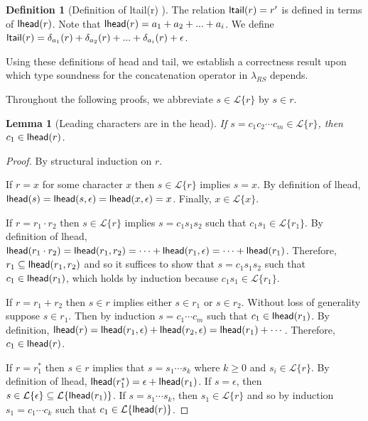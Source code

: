 \documentclass[11pt,leqno]{article}
\newtheorem{trlem}[tr]{Lemma}
\theoremstyle{definition}
\newtheorem{defn}[thm]{Definition}
\newcommand{\Lagr}{\mathcal{L}}
\newcommand{\lang}[1]{\Lagr\{#1\}}
\newcommand{\lambdas}{\lambda_{RS}}
\newcommand{\lhead}[1]{ {\sf lhead}(#1) }
\newcommand{\ltail}[1]{ {\sf ltail}(#1) }
\begin{document}
\begin{defn}[Definition of \ltail{r}]
The relation $\ltail{r} = r'$ is defined in terms of $\lhead{r}$.
Note that $\lhead{r} = a_1 + a_2 + ... + a_i$.
We define $\ltail{r} = \delta_{a_1}(r) + \delta_{a_2}(r) + ... + \delta_{a_i}(r) + \epsilon$.
\end{defn}

Using these definitions of head and tail, we establish a correctness
result upon which type soundness for the concatenation operator in
$\lambdas$ depends.

Throughout the following proofs, we abbreviate $s \in \lang{r}$ by $s \in r$.

\begin{trlem}[Leading characters are in the head] \label{trlemmax}
If $s = c_1  c_2 \cdots c_m \in \lang{r}$, then
$c_1 \in \lhead{r}$.
\end{trlem}
\begin{proof}
By structural induction on $r$.

If $r = x$ for some character $x$ then $s \in \lang{r}$ implies $s = x$.
By definition of lhead, $\lhead{s} = \lhead{s, \epsilon} = \lhead{x, \epsilon} = x$.
Finally, $x \in \lang{x}$.

If $r = r_1 \cdot r_2$ then $s \in \lang{r}$ implies $s = c_1 s_1 s_2$
such that $c_1 s_1 \in \lang{r_1}$. 
By definition of lhead, $\lhead{r_1 \cdot r_2} = \lhead{r_1, r_2} =
\cdots + \lhead{r_1, \epsilon} = \cdots + \lhead{r_1}$. Therefore, $r_1 \subseteq \lhead{r_1, r_2}$
and so it suffices to show that $s = c_1 s_1 s_2$ such that $c_1 \in \lhead{r_1}$,
which holds by induction because $c_1 s_1 \in \lang{r_1}$. 

If $r = r_1 + r_2$ then $s \in r$ implies either $s \in r_1$ or $s \in r_2$.
Without loss of generality suppose $s \in r_1$.
Then by induction $s = c_1 \cdots c_m$ such that $c_1 \in \lhead{r_1}$.
By definition, $\lhead{r} = \lhead{r_1, \epsilon} + \lhead{r_2, \epsilon} = \lhead{r_1} + \cdots$.
Therefore, $c_1 \in \lhead{r}$.

If $r = r_1^*$ then $s \in r$ implies that $s = s_1 \cdots s_k$ where $k \ge 0$ and $s_i \in \lang{r}$.
By definition of lhead, $\lhead{r_1^*} = \epsilon + \lhead{r_1}$.
If $s = \epsilon$, then $s \in \lang{\epsilon} \subseteq \lang{\lhead{r_1}}$.
If $s = s_1 \cdots s_k$, then $s_1 \in \lang{r}$ and so by induction $s_1 = c_1 \cdots c_k$ such that $c_1 \in \lang{\lhead{r}}$.
\end{proof}
\end{document}
